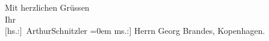 \pstart
           Mit herzlichen Grüssen{\\[\baselineskip]}Ihr{\\[\baselineskip]}\spacefill\mbox{{[}hs.:{]} ArthurSchnitzler}\pend
           \leftskip=0em{}
\pstart
           \noindent{}{[}ms.:{]} Herrn Georg Brandes, Kopenhagen.\pend
           \endnumbering{}  \newcommand{\dateiname}{L02114}\newcommand{\titel}{Arthur Schnitzler an Georg Brandes, 27. 2. 1913}\newcommand{\editorInnen}{Martin Anton Müller und Gerd-Hermann Susen}

